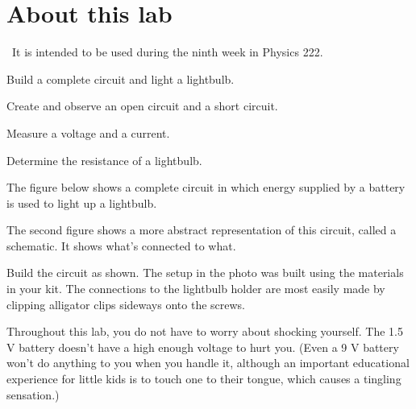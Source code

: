 \renewcommand\thechapter{c2.9a}
\label{lab:covid-electrical-measurements}

\section*{About this lab}

\covid\ 
It is intended to be used during the ninth week in Physics 222.

\apparatus
{}


\begin{goals}

\item[] Build a complete circuit and light a lightbulb.

\item[] Create and observe an open circuit and a short circuit.

\item[] Measure a voltage and a current.

\item[] Determine the resistance of a lightbulb.

\end{goals}


The figure below shows a complete circuit in which energy supplied
by a battery is used to light up a lightbulb. 


The second figure shows a more abstract representation of this circuit,
called a schematic. It shows what's connected to what.


Build the circuit as shown. The setup in the photo was built using the
materials in your kit. The connections to the lightbulb holder are most
easily made by clipping alligator clips sideways onto the screws.

Throughout this lab, you do not have to worry about shocking yourself.
The 1.5 V battery doesn't have a high enough voltage to hurt you.
(Even a 9 V battery won't do anything to you when you handle it,
although an important educational experience for little kids is
to touch one to their tongue, which causes a tingling sensation.)

